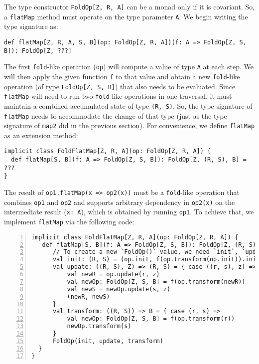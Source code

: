 The type constructor \lstinline!FoldOp[Z, R, A]! can be a monad only
if it is covariant. So, a \lstinline!flatMap! method must operate
on the type parameter \lstinline!A!. We begin writing the type signature
as:
\begin{lstlisting}
def flatMap[Z, R, A, S, B](op: FoldOp[Z, R, A])(f: A => FoldOp[Z, S, B]): FoldOp[Z, ???]
\end{lstlisting}
The first \lstinline!fold!-like operation (\lstinline!op!) will
compute a value of type \lstinline!A! at each step. We will then
apply the given function \lstinline!f! to that value and obtain a
new \lstinline!fold!-like operation (of type \lstinline!FoldOp[Z, S, B]!)
that also needs to be evaluated. Since \lstinline!flatMap! will need
to run two \lstinline!fold!-like operations in one traversal, it
must maintain a combined accumulated state of type \lstinline!(R, S)!.
So, the type signature of \lstinline!flatMap! needs to accommodate
the change of that type (just as the type signature of \lstinline!map2!
did in the previous section). For convenience, we define \lstinline!flatMap!
as an extension method: 
\begin{lstlisting}
implicit class FoldFlatMap[Z, R, A](op: FoldOp[Z, R, A]) {
  def flatMap[S, B](f: A => FoldOp[Z, S, B]): FoldOp[Z, (R, S), B] = ???
}
\end{lstlisting}
The result of \lstinline!op1.flatMap(x => op2(x))! must be a \lstinline!fold!-like
operation that combines \lstinline!op1! and \lstinline!op2! and
supports arbitrary dependency in \lstinline!op2(x)! on the intermediate
result (\lstinline!x: A!), which is obtained by running \lstinline!op1!.
To achieve that, we implement \lstinline!flatMap! via the following
code:
\begin{lstlisting}[numbers=left]
implicit class FoldFlatMap[Z, R, A](op: FoldOp[Z, R, A]) {
   def flatMap[S, B](f: A => FoldOp[Z, S, B]): FoldOp[Z, (R, S), B] = {
      // To create a new `FoldOp()` value, we need `init`, `update`, and `transform`.
      val init: (R, S) = (op.init, f(op.transform(op.init)).init) // Use `init` from both operations.
      val update: ((R, S), Z) => (R, S) = { case ((r, s), z) =>   // Run both `update` functions:
          val newR = op.update(r, z)                              // First `update` function.
          val newOp: FoldOp[Z, S, B] = f(op.transform(newR))      // We may use `newR` or `r` here!
          val newS = newOp.update(s, z)                           // Second `update` function.
          (newR, newS)
      }
      val transform: ((R, S)) => B = { case (r, s) =>
          val newOp: FoldOp[Z, S, B] = f(op.transform(r))
          newOp.transform(s)
      }
      FoldOp(init, update, transform)
  }
}
\end{lstlisting}

